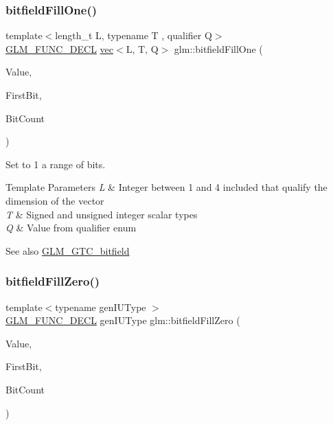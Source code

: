 \subsubsection{\texorpdfstring{bitfield\+Fill\+One()}{bitfieldFillOne()}\hspace{0.1cm}{\footnotesize\ttfamily [2/2]}}
{\footnotesize\ttfamily template$<$length\+\_\+t L, typename T , qualifier Q$>$ \\
\hyperlink{setup_8hpp_ab2d052de21a70539923e9bcbf6e83a51}{G\+L\+M\+\_\+\+F\+U\+N\+C\+\_\+\+D\+E\+CL} \hyperlink{structglm_1_1vec}{vec}$<$L, T, Q$>$ glm\+::bitfield\+Fill\+One (\begin{DoxyParamCaption}\item[{\hyperlink{structglm_1_1vec}{vec}$<$ L, T, Q $>$ const \&}]{Value,  }\item[{int}]{First\+Bit,  }\item[{int}]{Bit\+Count }\end{DoxyParamCaption})}

Set to 1 a range of bits.


\begin{DoxyTemplParams}{Template Parameters}
{\em L} & Integer between 1 and 4 included that qualify the dimension of the vector \\
\hline
{\em T} & Signed and unsigned integer scalar types \\
\hline
{\em Q} & Value from qualifier enum\\
\hline
\end{DoxyTemplParams}
\begin{DoxySeeAlso}{See also}
\hyperlink{group__gtc__bitfield}{G\+L\+M\+\_\+\+G\+T\+C\+\_\+bitfield} 
\end{DoxySeeAlso}
\mbox{\label{group__gtc__bitfield_ga697b86998b7d74ee0a69d8e9f8819fee}} 
\subsubsection{\texorpdfstring{bitfield\+Fill\+Zero()}{bitfieldFillZero()}\hspace{0.1cm}{\footnotesize\ttfamily [1/2]}}
{\footnotesize\ttfamily template$<$typename gen\+I\+U\+Type $>$ \\
\hyperlink{setup_8hpp_ab2d052de21a70539923e9bcbf6e83a51}{G\+L\+M\+\_\+\+F\+U\+N\+C\+\_\+\+D\+E\+CL} gen\+I\+U\+Type glm\+::bitfield\+Fill\+Zero (\begin{DoxyParamCaption}\item[{gen\+I\+U\+Type}]{Value,  }\item[{int}]{First\+Bit,  }\item[{int}]{Bit\+Count }\end{DoxyParamCaption})}

